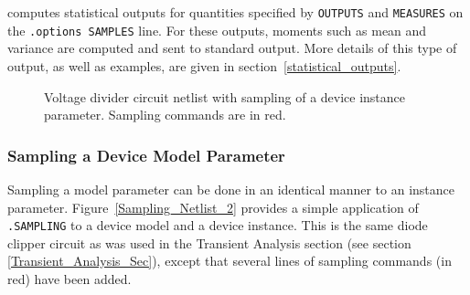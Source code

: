 \Xyce{} computes statistical outputs for quantities specified by \texttt{OUTPUTS} 
and \texttt{MEASURES} on the \texttt{.options SAMPLES} line.  For these outputs,
moments such as mean and variance are computed and sent to standard output.  More 
details of this type of output, as well as examples, are given in section~\ref{statistical_outputs}.
\begin{figure}[htbp]
  \fontsize{9pt}{10pt}
\begin{centering}
\caption{Voltage divider circuit netlist with sampling of a device instance parameter.
Sampling commands are in \color{XyceRed}red\color{black}.
\label{Sampling_Netlist_1}}
\end{centering}
\end{figure}

\subsubsection{Sampling a Device Model Parameter}
\label{sampling_ModelParam}

Sampling a model parameter can be done in an identical manner to an instance parameter.  
Figure~\ref{Sampling_Netlist_2} provides a simple application of \verb|.SAMPLING| to a 
device model and a device instance.  This is the same diode clipper circuit as was used 
in the Transient Analysis section (see section \ref{Transient_Analysis_Sec}), except that 
several lines of sampling commands (in red) have been added.  

